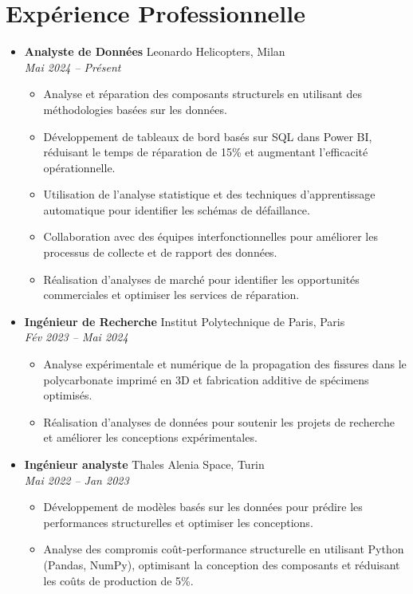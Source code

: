 \documentclass[letterpaper,10.5pt]{article}
\newcommand{\resumeEntry}[4]{
  \item\textbf{#1} \hfill #2\\
  \textit{#3} \hfill \textit{#4}
}
\newcommand{\resumeDescription}[1]{
  \vspace{-3pt}\begin{itemize}[leftmargin=0.2in]
    #1
  \end{itemize}
}
\begin{document}
\section*{Expérience Professionnelle}\vspace{-5pt}
\begin{itemize}[leftmargin=0.2in]
    \resumeEntry{Analyste de Données}{Leonardo Helicopters, Milan}{Mai 2024 -- Présent}{}
    \resumeDescription{
        \item Analyse et réparation des composants structurels en utilisant des méthodologies basées sur les données.
        \item Développement de tableaux de bord basés sur SQL dans Power BI, réduisant le temps de réparation de 15\% et augmentant l'efficacité opérationnelle.
        \item Utilisation de l'analyse statistique et des techniques d'apprentissage automatique pour identifier les schémas de défaillance.
        \item Collaboration avec des équipes interfonctionnelles pour améliorer les processus de collecte et de rapport des données.
        \item Réalisation d'analyses de marché pour identifier les opportunités commerciales et optimiser les services de réparation.
    }
    \resumeEntry{Ingénieur de Recherche}{Institut Polytechnique de Paris, Paris}{Fév 2023 -- Mai 2024}{}
    \resumeDescription{
        \item Analyse expérimentale et numérique de la propagation des fissures dans le polycarbonate imprimé en 3D et fabrication additive de spécimens optimisés.
        \item Réalisation d'analyses de données pour soutenir les projets de recherche et améliorer les conceptions expérimentales.
    }
    \resumeEntry{Ingénieur analyste}{Thales Alenia Space, Turin}{Mai 2022 -- Jan 2023}{}
    \resumeDescription{
        \item Développement de modèles basés sur les données pour prédire les performances structurelles et optimiser les conceptions.
        \item Analyse des compromis coût-performance structurelle en utilisant Python (Pandas, NumPy), optimisant la conception des composants et réduisant les coûts de production de 5\%.
    }
\end{itemize}

\end{document}
